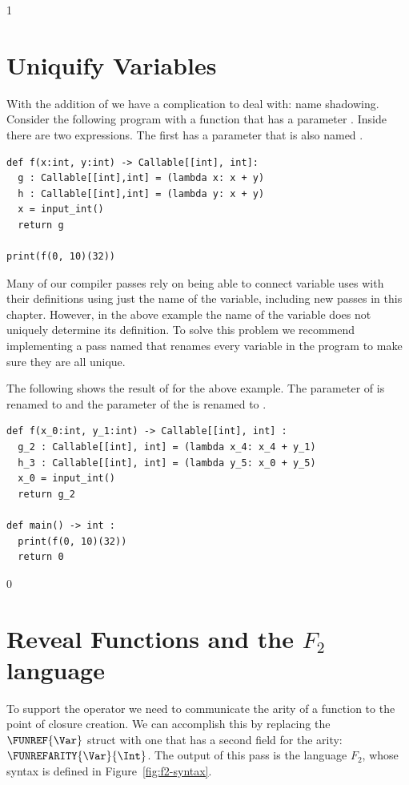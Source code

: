 \documentclass[7x10,nocrop]{TimesAPriori_MIT}%
\def\racketEd{0}
\def\pythonEd{1}
\def\edition{1}
\begin{document}
\if\edition\pythonEd
\section{Uniquify Variables}
\label{sec:uniquify-lambda}

With the addition of  we have a complication to deal
with: name shadowing. Consider the following program with a function
 that has a parameter . Inside  there are two
 expressions. The first  has a parameter
that is also named .

\begin{lstlisting}
def f(x:int, y:int) -> Callable[[int], int]:
  g : Callable[[int],int] = (lambda x: x + y)
  h : Callable[[int],int] = (lambda y: x + y)
  x = input_int()
  return g

print(f(0, 10)(32))
\end{lstlisting}

Many of our compiler passes rely on being able to connect variable
uses with their definitions using just the name of the variable,
including new passes in this chapter. However, in the above example
the name of the variable does not uniquely determine its
definition. To solve this problem we recommend implementing a pass
named  that renames every variable in the program to
make sure they are all unique.

The following shows the result of  for the above
example. The  parameter of  is renamed to 
and the  parameter of the  is renamed to
.

\begin{lstlisting}
def f(x_0:int, y_1:int) -> Callable[[int], int] :
  g_2 : Callable[[int], int] = (lambda x_4: x_4 + y_1)
  h_3 : Callable[[int], int] = (lambda y_5: x_0 + y_5)
  x_0 = input_int()
  return g_2

def main() -> int :
  print(f(0, 10)(32))
  return 0
\end{lstlisting}

\fi

\if\edition\racketEd
\section{Reveal Functions and the $F_2$ language}
\label{sec:reveal-functions-r5}

To support the  operator we need to communicate
the arity of a function to the point of closure creation.  We can
accomplish this by replacing the $\FUNREF{\Var}$ struct with one that
has a second field for the arity: $\FUNREFARITY{\Var}{\Int}$.  The
output of this pass is the language $F_2$, whose syntax is defined in
Figure~\ref{fig:f2-syntax}.
\end{document}
